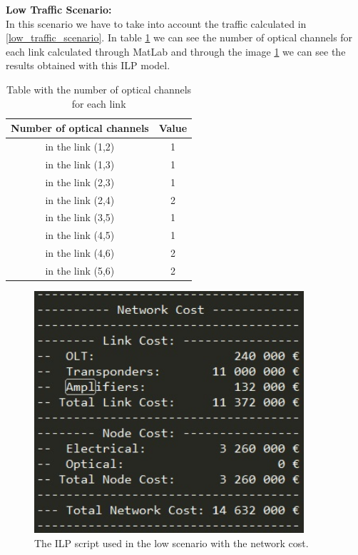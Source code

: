 \textbf{Low Traffic Scenario:}\\

In this scenario we have to take into account the traffic calculated in \ref{low_traffic_scenario}. In table \ref{result_ILP1_reference} we can see the number of optical channels for each link calculated through MatLab and through the image \ref{scriptopaque_surv_ref_low} we can see the results obtained with this ILP model.\\

\begin{table}[h!]
\centering
\begin{tabular}{|| c | c||}
 \hline
 Number of optical channels & Value \\
 \hline\hline
 in the link (1,2) & 1 \\
 in the link (1,3) & 1 \\
 in the link (2,3) & 1 \\
 in the link (2,4) & 2 \\
 in the link (3,5) & 1 \\
 in the link (4,5) & 1 \\
 in the link (4,6) & 2 \\
 in the link (5,6) & 2 \\
 \hline
\end{tabular}
\caption{Table with the number of optical channels for each link}
\label{result_ILP1_reference}
\end{table}


\begin{figure}[h!]
\centering
\includegraphics[width=10cm]{sdf/ilp/figures/script_opaque_surv_ref_low}
\caption{The ILP script used in the low scenario with the network cost.}
\label{scriptopaque_surv_ref_low}
\end{figure}

